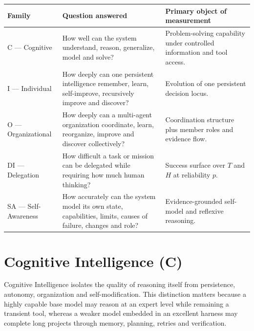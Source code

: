 \documentclass[11pt]{article}
\theoremstyle{definition}
\begin{document}
\begin{table}[h]
\centering\small
\begin{tabularx}{\textwidth}{@{}lYY@{}}
\toprule
Family & Question answered & Primary object of measurement \\
\midrule
C --- Cognitive & How well can the system understand, reason, generalize, model and solve? & Problem-solving capability under controlled information and tool access. \\
I --- Individual & How deeply can one persistent intelligence remember, learn, self-improve, recursively improve and discover? & Evolution of one persistent decision locus. \\
O --- Organizational & How deeply can a multi-agent organization coordinate, learn, reorganize, improve and discover collectively? & Coordination structure plus member roles and evidence flow. \\
DI --- Delegation & How difficult a task or mission can be delegated while requiring how much human thinking? & Success surface over $T$ and $H$ at reliability $p$. \\
SA --- Self-Awareness & How accurately can the system model its own state, capabilities, limits, causes of failure, changes and role? & Evidence-grounded self-model and reflexive reasoning. \\
\bottomrule
\end{tabularx}
\end{table}

\section{Cognitive Intelligence (C)}

Cognitive Intelligence isolates the quality of reasoning itself from persistence, autonomy, organization and self-modification. This distinction matters because a highly capable base model may reason at an expert level while remaining a transient tool, whereas a weaker model embedded in an excellent harness may complete long projects through memory, planning, retries and verification.
\end{document}
